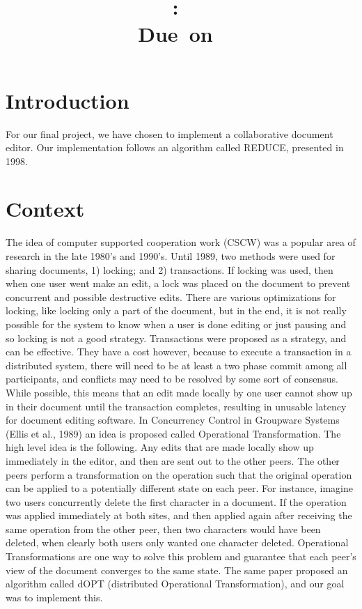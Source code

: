 \documentclass{article}
\title{
	\vspace{2in}
	\textmd{\textbf{\hmwkClass:\ \hmwkTitle}}\\
	\normalsize\vspace{0.1in}\small{Due\ on\ \hmwkDueDate}\\
	\vspace{0.1in}\large{\textit{\hmwkClassInstructor}}
}
\author{\hmwkAuthorName}
\date{}
\begin{document}
\maketitle

\pagebreak

\section{Introduction}
For our final project, we have chosen to implement a collaborative document editor. Our implementation follows an algorithm called REDUCE, presented in 1998.

\section{Context}
The idea of computer supported cooperation work (CSCW) was a popular area of research in the late 1980's and 1990's. Until 1989, two methods were used for sharing documents, 1) locking; and 2) transactions. If locking was used, then when one user went make an edit, a lock was placed on the document to prevent concurrent and possible destructive edits. There are various optimizations for locking, like locking only a part of the document, but in the end, it is not really possible for the system to know when a user is done editing or just pausing and so locking is not a good strategy. Transactions were proposed as a strategy, and can be effective. They have a cost however, because to execute a transaction in a distributed system, there will need to be at least a two phase commit among all participants, and conflicts may need to be resolved by some sort of consensus. While possible, this means that an edit made locally by one user cannot show up in their document until the transaction completes, resulting in unusable latency for document editing software. In Concurrency Control in Groupware Systems (Ellis et al., 1989) an idea is proposed called Operational Transformation. The high level idea is the following. Any edits that are made locally show up immediately in the editor, and then are sent out to the other peers. The other peers perform a transformation on the operation such that the original operation can be applied to a potentially different state on each peer. For instance, imagine two users concurrently delete the first character in a document. If the operation was applied immediately at both sites, and then applied again after receiving the same operation from the other peer, then two characters would have been deleted, when clearly both users only wanted one character deleted. Operational Transformations are one way to solve this problem and guarantee that each peer's view of the document converges to the same state. The same paper proposed an algorithm called dOPT (distributed Operational Transformation), and our goal was to implement this.\\
\end{document}
